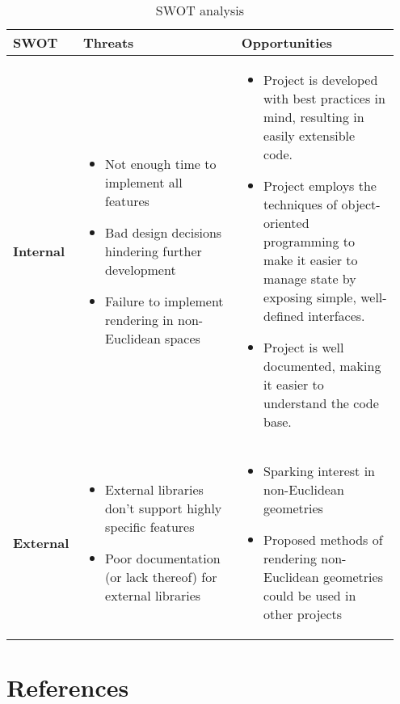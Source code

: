 \documentclass[12pt]{article}
\begin{document}
\begin{table}[H]
    \centering
    \begin{tabular}{|p{0.15\linewidth}|p{0.4\linewidth}|p{0.4\linewidth}|}
        \hline
        \textbf{SWOT} & \textbf{Threats}                                                                             & \textbf{Opportunities} \\ \hline
        \textbf{Internal}
                      & \begin{itemize}
                            \itemsep0em
                            \item Not enough time to implement all features
                            \item Bad design decisions hindering further development
                            \item Failure to implement rendering in non-Euclidean spaces
                        \end{itemize}
                      &
        \begin{itemize}
            \itemsep0em
            \item Project is developed with best practices in mind, resulting in easily extensible code.
            \item Project employs the techniques of object-oriented programming to make it easier to manage state by exposing simple, well-defined interfaces.
            \item Project is well documented, making it easier to understand the code base.
        \end{itemize}
        \\ \hline
        \textbf{External}
                      &
        \begin{itemize}
            \itemsep0em
            \item External libraries don't support highly specific features
            \item Poor documentation (or lack thereof) for external libraries
        \end{itemize}
                      & \begin{itemize}
                            \itemsep0em
                            \item Sparking interest in non-Euclidean geometries
                            \item Proposed methods of rendering non-Euclidean geometries could be used in other projects
                        \end{itemize}                           \\  \hline
    \end{tabular}
    \caption{SWOT analysis}
\end{table}

\newpage
\section{References}
\printbibliography
\end{document}

